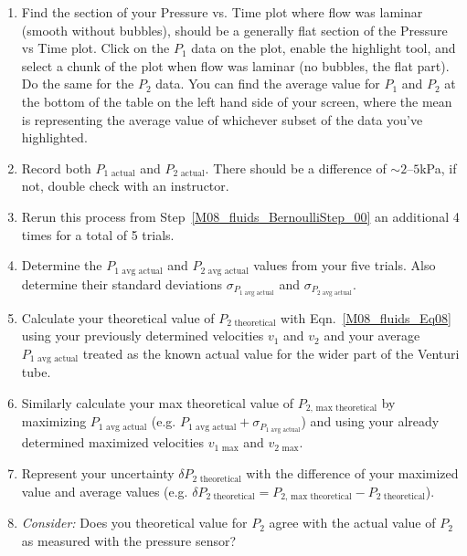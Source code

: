 \begin{enumerate}
\label{M08_fluids_BernoulliStep_00}
\item Find the section of your Pressure vs. Time plot where flow was laminar (smooth without bubbles), should be a generally flat section of the Pressure vs Time plot. Click on the $P_1$ data on the plot, enable the highlight tool, and select a chunk of the plot when flow was laminar (no bubbles, the flat part). Do the same for the $P_2$ data. You can find the average value for $P_1$ and $P_2$ at the bottom of the table on the left hand side of your screen, where the mean is representing the average value of whichever subset of the data you've highlighted.
\item Record both $P_{1\text{ actual}}$ and $P_{2\text{ actual}}$. There should be a difference of $\sim 2 \text{--} 5$kPa, if not, double check with an instructor.
\item Rerun this process from Step~\ref{M08_fluids_BernoulliStep_00} an additional 4 times for a total of 5 trials.
\item Determine the $P_{1\text{ avg actual}}$ and $P_{2\text{ avg actual}}$ values from your five trials. Also determine their standard deviations $\sigma_{P_{1\text{ avg actual}}}$ and $\sigma_{P_{2\text{ avg actual}}}$.
\item Calculate your theoretical value of $P_{2\text{ theoretical}}$ with Eqn.~\ref{M08_fluids_Eq08} using your previously determined velocities $v_1$ and $v_2$ and your average $P_{1\text{ avg actual}}$ treated as the known actual value for the wider part of the Venturi tube.
\item Similarly calculate your max theoretical value of $P_{2\text{, max theoretical}}$ by maximizing ${P_{1\text{ avg actual}}}$ (e.g. ${P_{1\text{ avg actual}}} + \sigma_{P_{1\text{ avg actual}}}$) and using your already determined maximized velocities $v_{1\text{ max}}$ and $v_{2\text{ max}}$.
\item Represent your uncertainty $\delta P_{2\text{ theoretical}}$ with the difference of your maximized value and average values (e.g. $\delta P_{2\text{ theoretical}} = P_{2\text{, max theoretical}} - P_{2\text{ theoretical}}$).
\item \textit{Consider:} Does you theoretical value for $P_2$ agree with the actual value of $P_2$ as measured with the pressure sensor?



















    
\end{enumerate}











